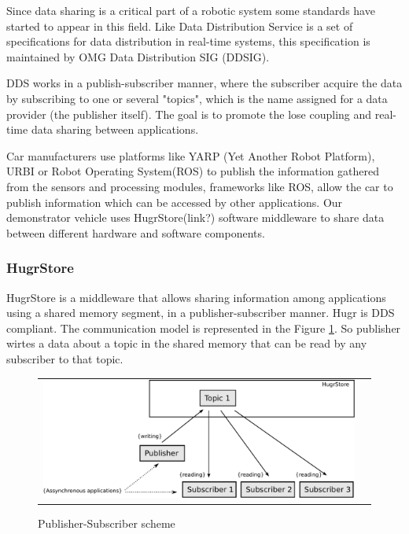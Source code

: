 Since data sharing is a critical part of a robotic system some standards have started to appear in this field. Like Data Distribution Service\cite{dds} is a set of specifications for data distribution in real-time systems, this specification is maintained by OMG Data Distribution SIG (DDSIG).

DDS works in a publish-subscriber manner, where the subscriber acquire the data by subscribing to one or several  "topics", which is the name assigned for a data provider (the publisher itself). The goal is to promote the lose coupling and real-time data sharing between applications.

Car manufacturers use platforms like YARP (Yet Another Robot Platform),  URBI \cite{urbi} or Robot Operating System(ROS) \cite{ros} to publish the information gathered from the sensors and processing modules, frameworks like ROS, allow the car to publish information  which can be accessed by other applications.%
Our demonstrator vehicle uses HugrStore(link?) software middleware to share data between different hardware and software components.


\subsubsection*{HugrStore}
HugrStore is a middleware that allows sharing information among applications using a shared memory segment, in a publisher-subscriber manner. Hugr is DDS compliant. The communication model is represented in the Figure \ref{fig:dds:hugr}. So publisher wirtes a data about a topic in the shared memory that can be read by any subscriber to that topic.

\begin{figure}[H]
   \centering
     \begin{tabular}{lr}
       \includegraphics[scale=0.50]{img/fig:dds:hugr}
     \end{tabular}
   \caption{Publisher-Subscriber scheme}
   \label{fig:dds:hugr}
\end{figure}

